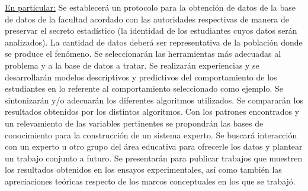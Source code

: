 
\underline{En particular:}
Se establecerá un protocolo para la obtención de datos de la base de datos de la facultad acordado con las
autoridades respectivas de manera de preservar el secreto estadístico (la identidad de los estudiantes cuyos datos serán
analizados). La cantidad de datos deberá ser representativa de la población donde se produce el fenómeno.
Se seleccionarán las herramientas más adecuadas al problema y a la base de datos a tratar.
Se realizarán experiencias y se desarrollarán modelos descriptivos y predictivos del comportamiento de los
estudiantes en lo referente al comportamiento seleccionado como ejemplo. Se sintonizarán y/o adecuarán los diferentes
algoritmos utilizados.
Se compararán los resultados obtenidos por los distintos algoritmos.
Con los patrones encontrados y un relevamiento de las variables pertinentes se propondrán las bases de
conocimiento para la construcción de un sistema experto.
Se buscará interacción con un experto u otro grupo del área educativa para ofrecerle los datos y plantear un trabajo
conjunto a futuro.
Se presentarán para publicar trabajos que muestren los resultados obtenidos en los ensayos experimentales, así
como también las apreciaciones teóricas respecto de los marcos conceptuales en los que se trabajó.